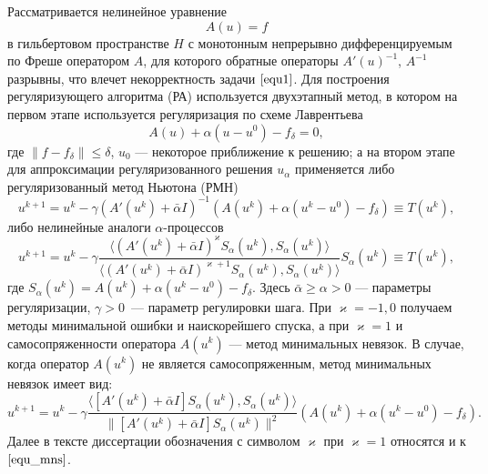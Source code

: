 Рассматривается нелинейное уравнение
\begin{equation}\label{equ1}A(u)=f\end{equation}
в гильбертовом пространстве $H$ с монотонным непрерывно дифференцируемым по Фреше оператором $A$, для которого обратные операторы $A'(u)^{-1}$, $A^{-1}$ разрывны, что влечет некорректность задачи $\eqref{equ1}$. Для построения регуляризующего алгоритма (РА) используется двухэтапный метод, в котором на первом этапе используется регуляризация по схеме Лаврентьева
\begin{equation}\label{equ2}A(u)+\alpha(u-u^0)-f_\delta=0,\end{equation}
где $\|f-f_\delta\|\le\delta$, $u_0$ --- некоторое приближение к решению; а на втором этапе для аппроксимации регуляризованного решения $u_\alpha$ применяется либо регуляризованный метод Ньютона (РМН)
\begin{equation}\label{equ_rmn}
u^{k+1}=u^k-\gamma(A'(u^k)+\bar\alpha I)^{-1}(A(u^k)+\alpha(u^k-u^0)-f_\delta)\equiv{T(u^k)},
\end{equation}
либо нелинейные аналоги $\alpha$-процессов
\begin{equation}\label{equ_alphaproc}
u^{k+1}=u^k-\gamma\frac{\langle (A'(u^k)+\bar\alpha I)^{\varkappa}S_\alpha(u^k), S_\alpha(u^k)\rangle }{\langle(A'(u^k)+\bar\alpha I)^{\varkappa+1}S_\alpha(u^k), S_\alpha(u^k)\rangle }S_\alpha(u^k)\equiv{T(u^k)},
\end{equation}
где $S_\alpha(u^k)=A(u^k)+\alpha(u^k-u^0)-f_\delta$. Здесь $\bar\alpha \ge \alpha >0$ --- параметры регуляризации, $\gamma>0$~--- параметр регулировки шага. При $\varkappa=-1,0$ получаем методы минимальной ошибки и наискорейшего спуска, а при $\varkappa=1$ и самосопряженности оператора $A(u^k)$ --- метод минимальных невязок.    
В случае, когда оператор $A(u^k)$ не является самосопряженным, метод минимальных невязок имеет вид:
\begin{equation}\label{equ_mmn}
u^{k+1} =u^k - \gamma\frac{\langle [A'(u^k)+\bar{\alpha}I]S_\alpha(u^k), S_\alpha (u^k)\rangle}{\|[A'(u^k)+\bar{\alpha}I]S_\alpha(u^k)\|^2}(A(u^k)+\alpha(u^k-u^0)-f_\delta).
\end{equation}
Далее в тексте диссертации обозначения с символом $\varkappa$ при $\varkappa=1$ относятся и к $\eqref{equ_mns}$.

